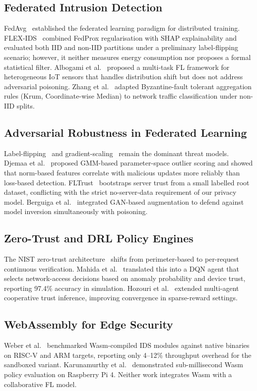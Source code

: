 \documentclass[sn-mathphys,Numbered]{sn-jnl}
\begin{document}
\subsection{Federated Intrusion Detection}
FedAvg~\cite{mcmahan2017} established the federated learning paradigm for distributed training. FLEX-IDS~\cite{flexids} combined FedProx regularisation with SHAP explainability and evaluated both IID and non-IID partitions under a preliminary label-flipping scenario; however, it neither measures energy consumption nor proposes a formal statistical filter. Albogami et al.~\cite{albogami2025} proposed a multi-task FL framework for heterogeneous IoT sensors that handles distribution shift but does not address adversarial poisoning. Zhang et al.~\cite{zhang2025} adapted Byzantine-fault tolerant aggregation rules (Krum, Coordinate-wise Median) to network traffic classification under non-IID splits.

\subsection{Adversarial Robustness in Federated Learning}
Label-flipping~\cite{tolpegin2020} and gradient-scaling~\cite{bagdasaryan2020} remain the dominant threat models. Djemaa et al.~\cite{djemaa2026} proposed GMM-based parameter-space outlier scoring and showed that norm-based features correlate with malicious updates more reliably than loss-based detection. FLTrust~\cite{cao2022} bootstraps server trust from a small labelled root dataset, conflicting with the strict no-server-data requirement of our privacy model. Berguiga et al.~\cite{berguiga2025} integrated GAN-based augmentation to defend against model inversion simultaneously with poisoning.

\subsection{Zero-Trust and DRL Policy Engines}
The NIST zero-trust architecture~\cite{rose2020} shifts from perimeter-based to per-request continuous verification. Mahida et al.~\cite{mahida2026} translated this into a DQN agent that selects network-access decisions based on anomaly probability and device trust, reporting 97.4\% accuracy in simulation. Hozouri et al.~\cite{hozouri2025} extended multi-agent cooperative trust inference, improving convergence in sparse-reward settings.

\subsection{WebAssembly for Edge Security}
Weber et al.~\cite{weber2026} benchmarked Wasm-compiled IDS modules against native binaries on RISC-V and ARM targets, reporting only 4--12\% throughput overhead for the sandboxed variant. Karunamurthy et al.~\cite{karunamurthy2025} demonstrated sub-millisecond Wasm policy evaluation on Raspberry Pi 4. Neither work integrates Wasm with a collaborative FL model.
\end{document}
